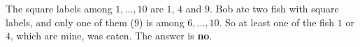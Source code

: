 The square labels among $1,\dots,10$ are $1$, $4$ and $9$. Bob ate two fish with square labels, and only one of them ($9$) is among $6,\dots,10$. So at least one of the fish $1$ or $4$, which are mine, was eaten. The answer is \textbf{no}.
